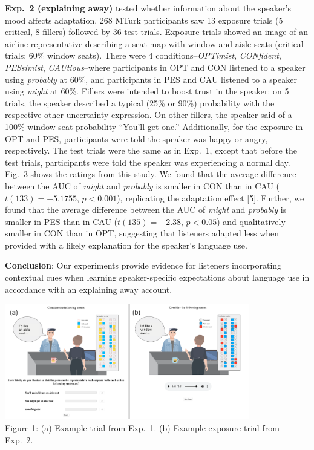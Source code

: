 \documentclass[11pt]{article}
\newcommand{\opt}[1]{\textcolor{OptColor}{#1}}
\newcommand{\pes}[1]{\textcolor{PesColor}{#1}}
\newcommand{\cau}[1]{\textcolor{CauColor}{#1}}
\newcommand{\con}[1]{\textcolor{ConColor}{#1}}
\begin{document}
\noindent \textbf{Exp.~2 (explaining away)} tested whether information about the speaker's mood affects adaptation. 268 MTurk participants saw 13 exposure trials (5 critical, 8 fillers) followed by 36 test trials. Exposure trials showed an image of an airline representative describing a seat map with window and aisle seats (critical trials: 60\% window seats). There were 4 conditions--\textit{\opt{OPTimist}}, \textit{\con{CONfident}}, \textit{\pes{PESsimist}}, \textit{\cau{CAUtious}}--where participants in \opt{OPT} and \con{CON} listened to a speaker using \textit{probably} at 60\%, and participants in \pes{PES} and \cau{CAU} listened to a speaker using \textit{might} at 60\%. Fillers were intended to boost trust in the speaker: on 5 trials, the speaker described a typical (25\% or 90\%) probability with the respective other uncertainty expression. On other fillers, the speaker said of a 100\% window seat probability ``You'll get one.'' Additionally, for the exposure in \opt{OPT} and \pes{PES}, participants were told the speaker was happy or angry, respectively. The test trials were the same as in Exp.~1, except that before the test trials, participants were told the speaker was experiencing a normal day. Fig.~3 shows the ratings from this study. We found that the average difference between the AUC of \textit{might} and \textit{probably} is smaller in \con{CON} than in \cau{CAU} ($t(133)=-5.1755$, $p < 0.001$), replicating the adaptation effect [5]. Further, we found that the average difference between the AUC of \textit{might} and \textit{probably} is smaller in \pes{PES} than in \cau{CAU} ($t(135)=-2.38$, $p < 0.05$) and qualitatively smaller in \con{CON} than in \opt{OPT}, suggesting that listeners adapted less when provided with a likely explanation for the speaker's language use.

\noindent \textbf{Conclusion}: Our experiments provide evidence for listeners incorporating contextual cues when learning speaker-specific expectations about language use in accordance with an explaining away account.

\hspace{0.06\textwidth}\includegraphics[width=0.8\textwidth]{./plots/example-trial.png}\\
{\small Figure 1: (a) Example trial from Exp.~1. (b) Example exposure trial from Exp.~2.}
\end{document}
